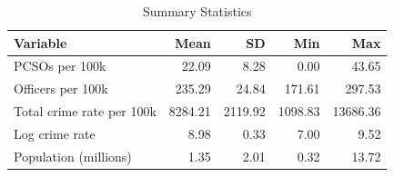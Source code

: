 \begin{table}[!h]
\centering
\caption{\label{tab:summary}Summary Statistics}
\centering
\begin{tabular}[t]{lrrrr}
\toprule
Variable & Mean & SD & Min & Max\\
\midrule
PCSOs per 100k & 22.09 & 8.28 & 0.00 & 43.65\\
Officers per 100k & 235.29 & 24.84 & 171.61 & 297.53\\
Total crime rate per 100k & 8284.21 & 2119.92 & 1098.83 & 13686.36\\
Log crime rate & 8.98 & 0.33 & 7.00 & 9.52\\
Population (millions) & 1.35 & 2.01 & 0.32 & 13.72\\
\bottomrule
\end{tabular}
\end{table}
